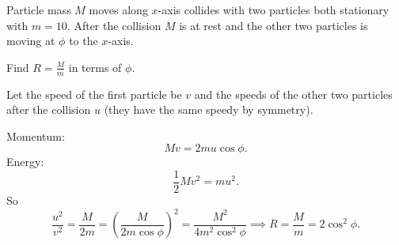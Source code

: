 \documentclass[10pt, a4paper]{article}
\begin{document}
\begin{problem}[2024 3.2.]
    Particle mass $M$ moves along $x$-axis collides with two particles both stationary with $m = 10$.
    After the collision $M$ is at rest and the other two particles is moving at $\phi$ to the $x$-axis.

    Find $R = \frac{M}{m}$ in terms of $\phi$.

    \begin{solution}
        Let the speed of the first particle be $v$ and the speeds of the other two particles after the collision $u$
        (they have the same speedy by symmetry).

        Momentum:
        \[
        Mv = 2mu\cos{\phi}.
        \]
        Energy:
        \[
        \frac{1}{2}Mv ^ 2 = mu ^ 2.
        \]
        So
        \[
        \frac{u ^ 2}{v ^ 2} = \frac{M}{2m} = \left(\frac{M}{2m\cos{\phi}}\right) ^ 2 = \frac{M ^ 2}{4m ^ 2\cos ^ 2{\phi}} \implies R = \frac{M}{m} = 2\cos ^ 2{\phi}.
        \]
    \end{solution}
\end{problem}
\end{document}
